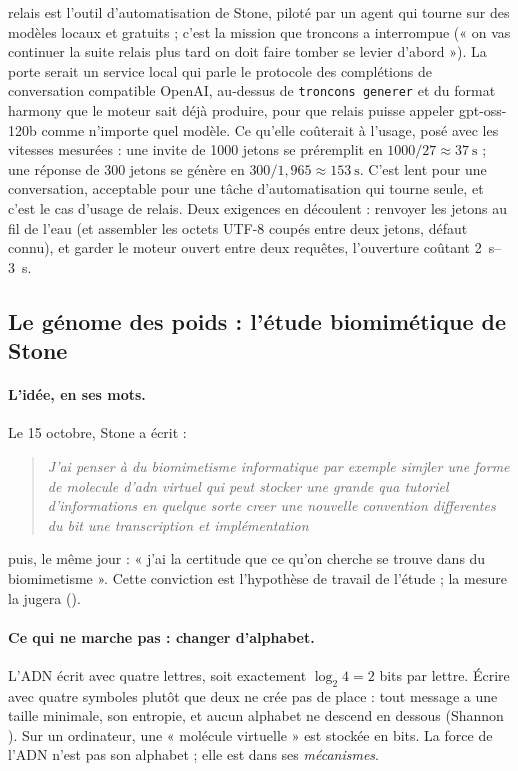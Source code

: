 relais est l'outil d'automatisation de Stone, piloté par un agent qui tourne sur des modèles locaux et gratuits ; c'est la mission que troncons a interrompue (« on vas continuer la suite relais plus tard on doit faire tomber se levier d'abord »). La porte serait un service local qui parle le protocole des complétions de conversation compatible OpenAI, au-dessus de \texttt{troncons generer} et du format harmony que le moteur sait déjà produire, pour que relais puisse appeler gpt-oss-120b comme n'importe quel modèle. Ce qu'elle coûterait à l'usage, posé avec les vitesses mesurées \calc : une invite de \num{1000} jetons se préremplit en $1000/27 \approx \SI{37}{\second}$ ; une réponse de 300 jetons se génère en $300/1{,}965 \approx \SI{153}{\second}$. C'est lent pour une conversation, acceptable pour une tâche d'automatisation qui tourne seule, et c'est le cas d'usage de relais. Deux exigences en découlent : renvoyer les jetons au fil de l'eau (et assembler les octets UTF-8 coupés entre deux jetons, défaut connu), et garder le moteur ouvert entre deux requêtes, l'ouverture coûtant \SIrange{2}{3}{\second}.

\subsection{Le génome des poids : l'étude biomimétique de Stone}\label{t2d-sec:genome}

\paragraph{L'idée, en ses mots.} Le 15 octobre, Stone a écrit :
\begin{quote}\itshape
J'ai penser à du biomimetisme informatique par exemple simjler une forme de molecule d'adn virtuel qui peut stocker une grande qua tutoriel d'informations en quelque sorte creer une nouvelle convention differentes du bit une transcription et implémentation
\end{quote}
puis, le même jour : « j'ai la certitude que ce qu'on cherche se trouve dans du biomimetisme ». Cette conviction est l'hypothèse de travail de l'étude ; la mesure la jugera ().

\paragraph{Ce qui ne marche pas : changer d'alphabet.} L'ADN écrit avec quatre lettres, soit exactement $\log_2 4 = 2$ bits par lettre. Écrire avec quatre symboles plutôt que deux ne crée pas de place : tout message a une taille minimale, son entropie, et aucun alphabet ne descend en dessous (Shannon \cite{shannon1948}). Sur un ordinateur, une « molécule virtuelle » est stockée en bits. La force de l'ADN n'est pas son alphabet ; elle est dans ses \emph{mécanismes}.

